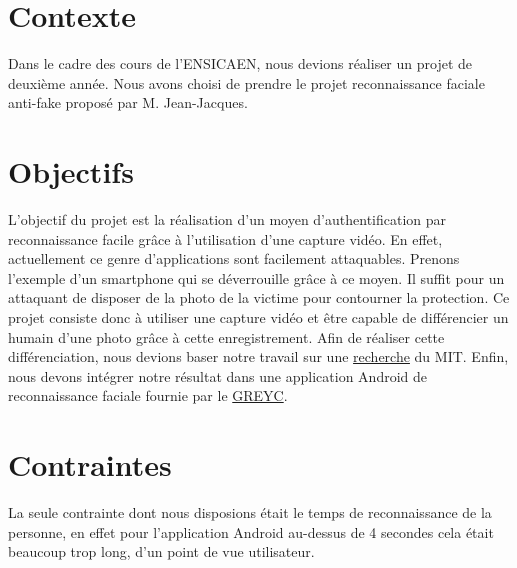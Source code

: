 \section{Contexte}

Dans le cadre des cours de l'ENSICAEN, nous devions réaliser un projet de deuxième année. Nous avons choisi de prendre le projet reconnaissance faciale anti-fake proposé
par M.  Jean-Jacques. 

\section{Objectifs}

L'objectif du projet est la réalisation d'un moyen d'authentification par reconnaissance facile grâce à l'utilisation d'une capture vidéo. En effet, actuellement ce genre d'applications sont facilement 
attaquables. Prenons l'exemple d'un smartphone qui se déverrouille grâce à ce moyen. Il suffit pour un attaquant de disposer de la photo de la victime pour contourner la protection. Ce projet consiste donc 
à utiliser une capture vidéo et être capable de différencier un humain d'une photo grâce à cette enregistrement. Afin de réaliser cette différenciation, nous devions baser notre travail sur une \href{http://people.csail.mit.edu/mrub/papers/vidmag.pdf}{recherche} du MIT. Enfin, nous devons intégrer notre résultat dans une application Android de reconnaissance faciale fournie par le \href{https://www.greyc.fr/}{GREYC}.

\section{Contraintes}

La seule contrainte dont nous disposions était le temps de reconnaissance de la personne, en effet pour l'application Android au-dessus de 4 secondes cela était beaucoup trop long, d'un point de vue 
utilisateur. 
